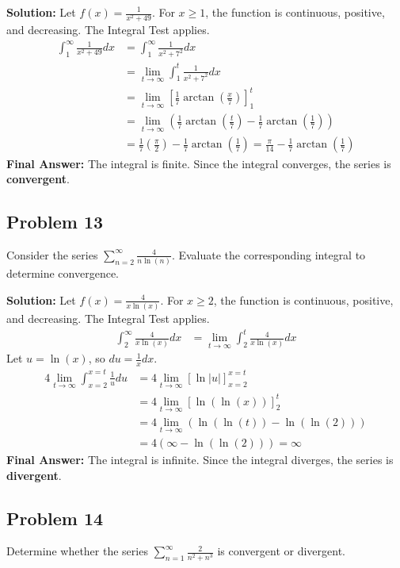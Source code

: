 \documentclass{article}
\begin{document}
\textbf{Solution:}
Let $f(x) = \frac{1}{x^2+49}$. For $x \ge 1$, the function is continuous, positive, and decreasing. The Integral Test applies.
\begin{align*}
    \int_1^\infty \frac{1}{x^2+49} dx &= \int_1^\infty \frac{1}{x^2+7^2} dx \\
    &= \lim_{t \to \infty} \int_1^t \frac{1}{x^2+7^2} dx \\
    &= \lim_{t \to \infty} \left[ \frac{1}{7}\arctan\left(\frac{x}{7}\right) \right]_1^t \\
    &= \lim_{t \to \infty} \left( \frac{1}{7}\arctan\left(\frac{t}{7}\right) - \frac{1}{7}\arctan\left(\frac{1}{7}\right) \right) \\
    &= \frac{1}{7} \left( \frac{\pi}{2} \right) - \frac{1}{7}\arctan\left(\frac{1}{7}\right) = \frac{\pi}{14} - \frac{1}{7}\arctan\left(\frac{1}{7}\right)
\end{align*}
\textbf{Final Answer:} The integral is finite. Since the integral converges, the series is \textbf{convergent}.

\subsection*{Problem 13}
Consider the series $\sum_{n=2}^{\infty} \frac{4}{n \ln(n)}$. Evaluate the corresponding integral to determine convergence.

\textbf{Solution:}
Let $f(x) = \frac{4}{x \ln(x)}$. For $x \ge 2$, the function is continuous, positive, and decreasing. The Integral Test applies.
\begin{align*}
    \int_2^\infty \frac{4}{x \ln(x)} dx &= \lim_{t \to \infty} \int_2^t \frac{4}{x \ln(x)} dx
\end{align*}
Let $u = \ln(x)$, so $du = \frac{1}{x}dx$.
\begin{align*}
    4 \lim_{t \to \infty} \int_{x=2}^{x=t} \frac{1}{u} du &= 4 \lim_{t \to \infty} \left[ \ln|u| \right]_{x=2}^{x=t} \\
    &= 4 \lim_{t \to \infty} \left[ \ln(\ln(x)) \right]_2^t \\
    &= 4 \lim_{t \to \infty} (\ln(\ln(t)) - \ln(\ln(2))) \\
    &= 4 (\infty - \ln(\ln(2))) = \infty
\end{align*}
\textbf{Final Answer:} The integral is infinite. Since the integral diverges, the series is \textbf{divergent}.

\subsection*{Problem 14}
Determine whether the series $\sum_{n=1}^{\infty} \frac{2}{n^2+n^3}$ is convergent or divergent.
\end{document}
